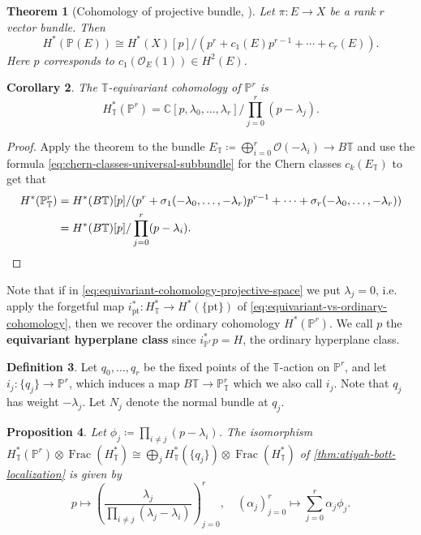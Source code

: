 \documentclass{report}
\theoremstyle{plain}
\newtheorem{theorem}{Theorem}[section]
\newtheorem{proposition}[theorem]{Proposition}
\newtheorem{corollary}[theorem]{Corollary}
\theoremstyle{definition}
\newtheorem{definition}[theorem]{Definition}
\theoremstyle{remark}
\newcommand{\bC}{\mathbb{C}}
\newcommand{\bT}{\mathbb{T}}
\newcommand{\bP}{\mathbb{P}}
\newcommand{\cO}{\mathcal{O}}
\DeclareMathOperator{\Frac}{Frac}
\newcommand{\pt}{\mathrm{pt}}
\begin{document}
\begin{theorem}[Cohomology of projective bundle, {\cite[Example 8.3.4]{Fulton1998}}]
  Let $\pi\colon E \to X$ be a rank $r$ vector bundle. Then
  \[ H^*(\bP(E)) \cong H^*(X)[p]/(p^r + c_1(E)p^{r-1} + \cdots + c_r(E)). \]
  Here $p$ corresponds to $c_1(\cO_E(1)) \in H^2(E)$.
\end{theorem}

\begin{corollary}
  The $\bT$-equivariant cohomology of $\bP^r$ is
  \begin{equation} \label{eq:equivariant-cohomology-projective-space}
    H^*_{\bT}(\bP^r) = \bC[p, \lambda_0, \ldots, \lambda_r]/\prod_{j=0}^r (p - \lambda_j).
  \end{equation}
\end{corollary}

\begin{proof}
  Apply the theorem to the bundle $E_{\bT} \coloneqq \bigoplus_{i=0}^r
  \cO(-\lambda_i) \to B\bT$ and use the formula
  \eqref{eq:chern-classes-universal-subbundle} for the Chern classes
  $c_k(E_{\bT})$ to get that
  \begin{align*}
    H^*(\bP^r_{\bT})
    &= H^*(B\bT)[p]/(p^r + \sigma_1(-\lambda_0, \ldots, -\lambda_r)p^{r-1} + \cdots + \sigma_r(-\lambda_0, \ldots, -\lambda_r)) \\
    &= H^*(B\bT)[p]/\prod_{j=0}^r (p-\lambda_i). \qedhere
  \end{align*}
\end{proof}

Note that if in \eqref{eq:equivariant-cohomology-projective-space} we
put $\lambda_j = 0$, i.e. apply the forgetful map $i_{\pt}^*\colon
H^*_{\bT} \to H^*(\{\pt\})$ of
\eqref{eq:equivariant-vs-ordinary-cohomology}, then we recover the
ordinary cohomology $H^*(\bP^r)$. We call $p$ the {\bf equivariant
  hyperplane class} since $i_{\bP^r}^*p = H$, the ordinary hyperplane
class.

\begin{definition}
  Let $q_0, \ldots, q_r$ be the fixed points of the $\bT$-action on
  $\bP^r$, and let $i_j\colon \{q_j\} \to \bP^r$, which induces a map
  $B\bT \to \bP^r_{\bT}$ which we also call $i_j$. Note that $q_j$ has
  weight $-\lambda_j$. Let $N_j$ denote the normal bundle at $q_j$.
\end{definition}

\begin{proposition} \label{thm:localization-on-projective-space}
  Let $\phi_j \coloneqq \prod_{i \neq j} (p - \lambda_i)$. The
  isomorphism $H_{\bT}^*(\bP^r) \otimes \Frac(H_{\bT}^*) \cong
  \bigoplus_j H_{\bT}^*(\{q_j\}) \otimes \Frac(H_{\bT}^*)$ of
  \ref{thm:atiyah-bott-localization} is given by
  \[ p \mapsto \left(\frac{\lambda_j}{\prod_{i \neq j} (\lambda_j - \lambda_i)}\right)_{j=0}^r, \quad (\alpha_j)_{j=0}^r \mapsto \sum_{j=0}^r \alpha_j \phi_j. \]
\end{proposition}
\end{document}

